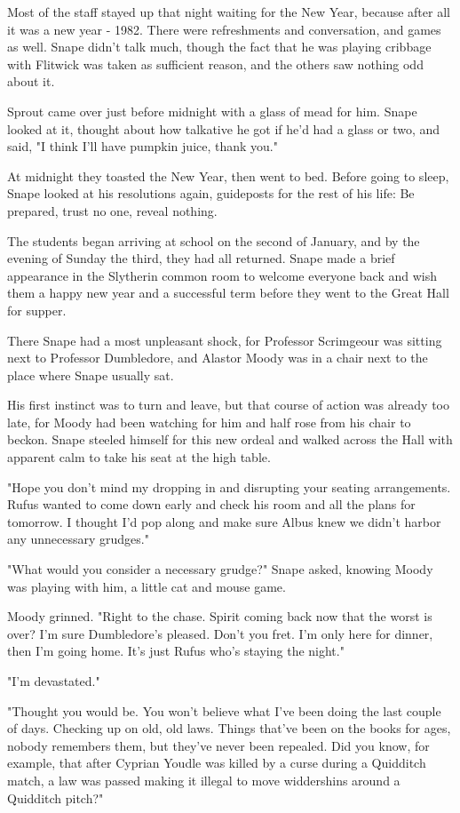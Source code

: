 Most of the staff stayed up that night waiting for the New Year, because after all it was a new year - 1982. There were refreshments and conversation, and games as well. Snape didn't talk much, though the fact that he was playing cribbage with Flitwick was taken as sufficient reason, and the others saw nothing odd about it.

Sprout came over just before midnight with a glass of mead for him. Snape looked at it, thought about how talkative he got if he'd had a glass or two, and said, "I think I'll have pumpkin juice, thank you."

At midnight they toasted the New Year, then went to bed. Before going to sleep, Snape looked at his resolutions again, guideposts for the rest of his life: Be prepared, trust no one, reveal nothing.

The students began arriving at school on the second of January, and by the evening of Sunday the third, they had all returned. Snape made a brief appearance in the Slytherin common room to welcome everyone back and wish them a happy new year and a successful term before they went to the Great Hall for supper.

There Snape had a most unpleasant shock, for Professor Scrimgeour was sitting next to Professor Dumbledore, and Alastor Moody was in a chair next to the place where Snape usually sat.

His first instinct was to turn and leave, but that course of action was already too late, for Moody had been watching for him and half rose from his chair to beckon. Snape steeled himself for this new ordeal and walked across the Hall with apparent calm to take his seat at the high table.

"Hope you don't mind my dropping in and disrupting your seating arrangements. Rufus wanted to come down early and check his room and all the plans for tomorrow. I thought I'd pop along and make sure Albus knew we didn't harbor any unnecessary grudges."

"What would you consider a necessary grudge?" Snape asked, knowing Moody was playing with him, a little cat and mouse game.

Moody grinned. "Right to the chase. Spirit coming back now that the worst is over? I'm sure Dumbledore's pleased. Don't you fret. I'm only here for dinner, then I'm going home. It's just Rufus who's staying the night."

"I'm devastated."

"Thought you would be. You won't believe what I've been doing the last couple of days. Checking up on old, old laws. Things that've been on the books for ages, nobody remembers them, but they've never been repealed. Did you know, for example, that after Cyprian Youdle was killed by a curse during a Quidditch match, a law was passed making it illegal to move widdershins around a Quidditch pitch?"


